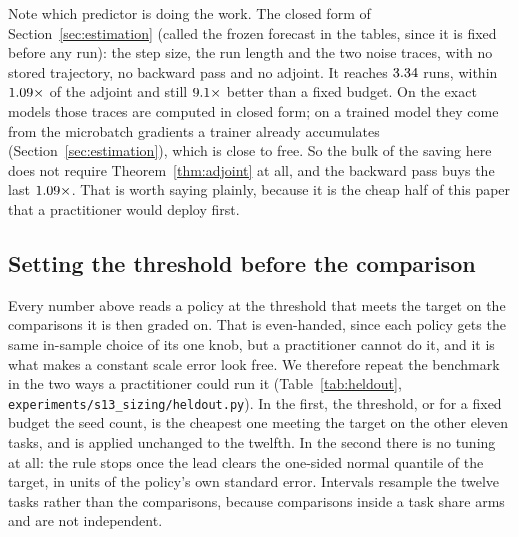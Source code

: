 Note which predictor is doing the work. The closed form of Section~\ref{sec:estimation}
(called the frozen forecast in the tables, since it is fixed before any run): the step size, the run length and the two noise traces, with no
stored trajectory, no backward pass and no adjoint. It reaches $3.34$ runs, within
$1.09\times$ of the adjoint and still $9.1\times$ better than a fixed budget. On the
exact models those traces are computed in closed form; on a trained model they come from the
microbatch gradients a trainer already accumulates (Section~\ref{sec:estimation}), which is close
to free. So the bulk of the saving here does not require Theorem~\ref{thm:adjoint} at all, and the
backward pass buys the last $1.09\times$. That is worth saying plainly, because it is
the cheap half of this paper that a practitioner would deploy first.

\subsection{Setting the threshold before the comparison}
\label{sec:heldout}

Every number above reads a policy at the threshold that meets the target on the comparisons it is
then graded on. That is even-handed, since each policy gets the same in-sample choice of its one
knob, but a practitioner cannot do it, and it is what makes a constant scale error look free. We
therefore repeat the benchmark in the two ways a practitioner could run it (Table~\ref{tab:heldout},
\texttt{experiments/s13\_sizing/heldout.py}). In the first, the threshold, or for a fixed budget
the seed count, is the cheapest one meeting the target on the other eleven tasks, and is applied
unchanged to the twelfth. In the second there is no tuning at all: the rule stops once the lead
clears the one-sided normal quantile of the target, in units of the policy's own standard error.
Intervals resample the twelve tasks rather than the comparisons, because comparisons inside a task
share arms and are not independent.

\begin{table}[t]
  \centering
  
  \caption{Runs per comparison and realised mistake rate over $\numHeldLoosePairs$ comparisons
  when no threshold is read off the comparisons being graded. Upper block: each policy's threshold
  is fitted on the other eleven tasks and applied to the twelfth. Lower block: the textbook
  threshold, with no tuning. At $0.1\%$ the fixed budget sits at the $16$-seed cap, so the last row
  extrapolates it without one from the normal approximation.}
  \label{tab:heldout}
\end{table}

